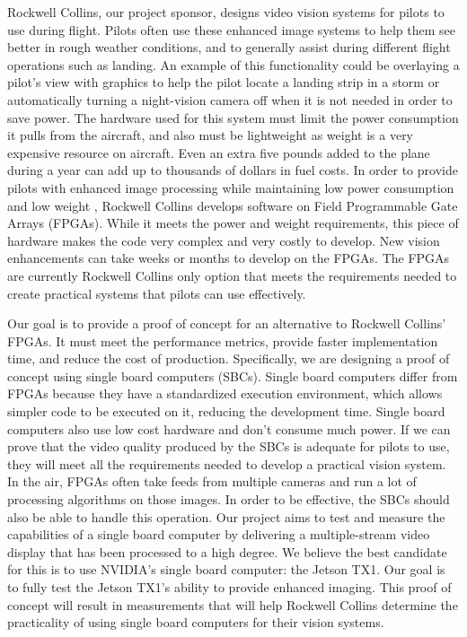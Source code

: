 Rockwell Collins, our project sponsor, designs video vision systems for pilots to use during flight. Pilots often use these enhanced image systems to help them see better in rough weather conditions, and to generally assist during different flight operations such as landing. An example of this functionality could be overlaying a pilot's view with graphics to help the pilot locate a landing strip in a storm or automatically turning a night-vision camera off when it is not needed in order to save power. The hardware used for this system must limit the power consumption it pulls from the aircraft, and also must be lightweight as weight is a very expensive resource on aircraft. Even an extra five pounds added to the plane during a year can add up to thousands of dollars in fuel costs. In order to provide pilots with enhanced image processing while maintaining low power consumption and low weight , Rockwell Collins develops software on Field Programmable Gate Arrays (FPGAs). While it meets the power and weight requirements, this piece of hardware makes the code very complex and very costly to develop. New vision enhancements can take weeks or months to develop on the FPGAs. The FPGAs are currently Rockwell Collins only option that meets the requirements needed to create practical systems that pilots can use effectively.\\
\par
Our goal is to provide a proof of concept for an alternative to Rockwell Collins' FPGAs. It must meet the performance metrics, provide faster implementation time, and reduce the cost of production. Specifically, we are designing a proof of concept using single board computers (SBCs). Single board computers differ from FPGAs because they have a standardized execution environment, which allows simpler code to be executed on it, reducing the development time. Single board computers also use low cost hardware and don't consume much power. If we can prove that the video quality produced by the SBCs is adequate for pilots to use, they will meet all the requirements needed to develop a practical vision system. In the air, FPGAs often take feeds from multiple cameras and run a lot of processing algorithms on those images. In order to be effective, the SBCs should also be able to handle this operation. Our project aims to test and measure the capabilities of a single board computer by delivering a multiple-stream video display that has been processed to a high degree. We believe the best candidate for this is to use NVIDIA's single board computer: the Jetson TX1. Our goal is to fully test the Jetson TX1's ability to provide enhanced imaging. This proof of concept will result in measurements that will help Rockwell Collins determine the practicality of using single board computers for their vision systems.\\
